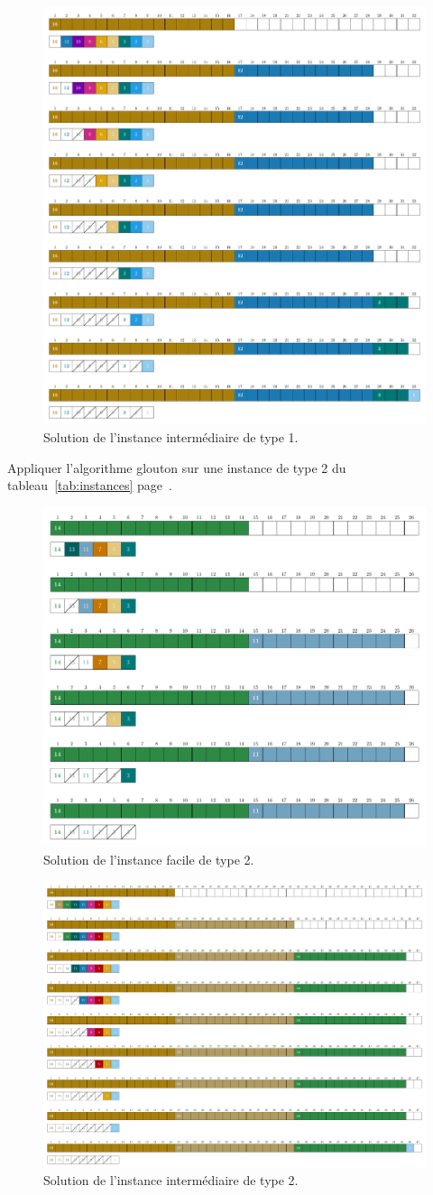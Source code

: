 \documentclass[11pt]{article}
\newcommand{\instance}[1]{instance de type #1 du tableau~\ref{tab:instances} page~\pageref{tab:instances}}
\begin{document}
    \begin{figure}[htbp]
    \centering
    \includegraphics[width=0.6\linewidth]{ex1-9-GS.pdf}
    \caption{Solution de l'instance intermédiaire de type 1.}
  \end{figure}

\begin{exercice}{}
    Appliquer l'algorithme glouton sur une \instance{2}.
  \end{exercice}

  \begin{figure}[htbp]
    \centering
    \includegraphics[width=0.6\linewidth]{ex2-6-GS.pdf}
    \caption{Solution de l'instance facile de type 2.}
  \end{figure}

  \begin{figure}[htbp]
    \centering
    \includegraphics[width=0.6\linewidth]{ex2-9-GS.pdf}
    \caption{Solution de l'instance intermédiaire de type 2.}
  \end{figure}
\end{document}
